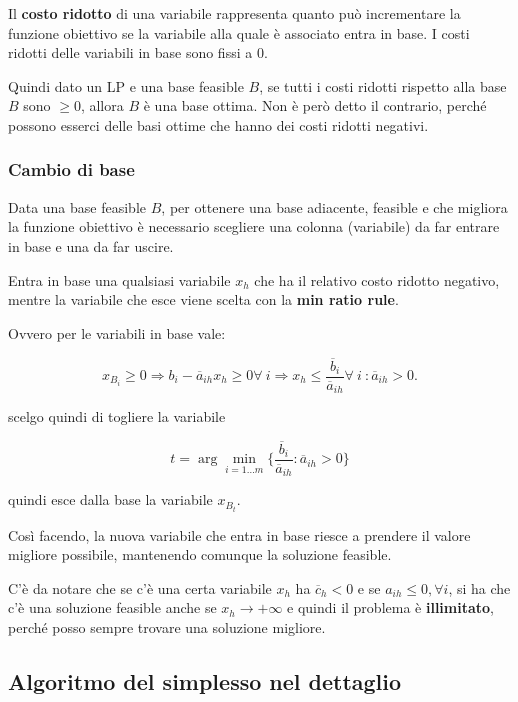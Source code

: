 \noindent Il \textbf{costo ridotto} di una variabile rappresenta quanto può incrementare la funzione obiettivo se la variabile alla quale è associato entra in base. I costi ridotti delle variabili in base sono fissi a 0.

Quindi dato un LP e una base feasible $B$, se tutti i costi ridotti rispetto alla base $B$ sono $\geq 0$, allora $B$ è una base ottima.
Non è però detto il contrario, perché possono esserci delle basi ottime che hanno dei costi ridotti negativi.

\subsubsection{Cambio di base}

Data una base feasible $B$, per ottenere una base adiacente, feasible e che migliora la funzione obiettivo è necessario scegliere una colonna (variabile) da far entrare in base e una da far uscire.

Entra in base una qualsiasi variabile $x_h$ che ha il relativo costo ridotto negativo, mentre la variabile che esce viene scelta con la \textbf{min ratio rule}.

Ovvero per le variabili in base vale:

$$
x_{B_i} \geq 0 \Rightarrow b_i - \overline{a}_{ih}x_h \geq 0 \forall \: i \Rightarrow  x_h \leq \frac{\overline{b}_i}{\overline{a}_{ih}} \forall \: i \: : \overline{a}_{ih} > 0.
$$

\noindent scelgo quindi di togliere la variabile

$$
t = \arg \min_{i = 1 \ldots m} \bigg\{ \frac{\overline{b}_i}{\overline{a}_{ih}}  : \overline{a}_{ih} > 0 \bigg\}
$$

\noindent quindi esce dalla base la variabile $x_{B_t}$.

Così facendo, la nuova variabile che entra in base riesce a prendere il valore migliore possibile, mantenendo comunque la soluzione feasible.

C'è da notare che se c'è una certa variabile $x_h$ ha $\overline{c}_h < 0$ e se $a_{ih} \leq 0, \forall i$, si ha che c'è una soluzione feasible anche se $x_h \to +\infty$ e quindi il problema è \textbf{illimitato}, perché posso sempre trovare una soluzione migliore.

\subsection{Algoritmo del simplesso nel dettaglio}

